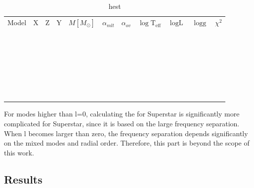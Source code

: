 \begin{table}[htbp]
  \caption{hest}
  \label{tab:superstar}

\begin{tabular}{lllllllllll}
\label{bestchi}
 Model & X & Z & Y & $M[M_\odot]$ & $\alpha_{mlt}$ & $\alpha_{ov}$ & $\log \text{T}_\text{eff}$  & $\log \text{L}$  & $\log \text{g}$ & $\chi^2$ \\
 &  &  &  &  &  &  &  &  &  &  \\
 &  &  &  &  &  &  &  &  &  &  \\
 &  &  &  &  &  &  &  &  &  &  \\
 &  &  &  &  &  &  &  &  &  &  \\
 &  &  &  &  &  &  &  &  &  &  \\
 &  &  &  &  &  &  &  &  &  &  \\
 &  &  &  &  &  &  &  &  &  &  \\
 &  &  &  &  &  &  &  &  &  &  \\
 &  &  &  &  &  &  &  &  &  &  \\
 &  &  &  &  &  &  &  &  &  &  \\
 &  &  &  &  &  &  &  &  &  &  \\
 &  &  &  &  &  &  &  &  &  &  \\
 &  &  &  &  &  &  &  &  &  &  \\
 &  &  &  &  &  &  &  &  &  &  \\
 &  &  &  &  &  &  &  &  &  &  \\
 &  &  &  &  &  &  &  &  &  &  \\
 &  &  &  &  &  &  &  &  &  &  \\
 &  &  &  &  &  &  &  &  &  &  \\
 &  &  &  &  &  &  &  &  &  &  \\
 &  &  &  &  &  &  &  &  &  &  \\
 &  &  &  &  &  &  &  &  &  &  \\
 &  &  &  &  &  &  &  &  &  &  \\
 &  &  &  &  &  &  &  &  &  &  \\
 &  &  &  &  &  &  &  &  &  &  \\
 &  &  &  &  &  &  &  &  &  &  \\
 &  &  &  &  &  &  &  &  &  &  \\
 &  &  &  &  &  &  &  &  &  &  \\
 &  &  &  &  &  &  &  &  &  & 
\end{tabular}
\end{table}

For modes higher than l=0, calculating the \chis for Superstar is significantly more complicated for Superstar, since it is based on the large frequency separation. When l becomes larger than zero, the frequency separation depends significantly on the mixed modes and radial order. Therefore, this part is beyond the scope of this work. 

\subsection{Results}

